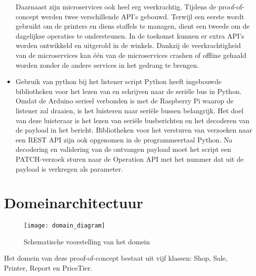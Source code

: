 \begin{itemize}
    Daarnaast zijn microservices ook heel erg veerkrachtig.
    Tijdens de proof-of-concept werden twee verschillende API's gebouwd. Terwijl een eerste wordt gebruikt om de printers en diens staffels te managen, dient een tweede om de dagelijkse operaties te ondersteunen. In de toekomst kunnen er extra API's worden ontwikkeld en uitgerold in de winkels. Dankzij de veerkrachtigheid van de microservices kan één van de microservices crashen of offline gehaald worden zonder de andere services in het gedrang te brengen.
    
    \item Gebruik van python bij het listener script
    Python heeft ingebouwde bibliotheken voor het lezen van en schrijven naar de seriële bus in Python. Omdat de Arduino serieel verbonden is met de Raspberry Pi waarop de listener zal draaien, is het luisteren naar seriële bussen belangrijk. Het doel van deze luisteraar is het lezen van seriële busberichten en het decoderen van de payload in het bericht.
    Bibliotheken voor het versturen van verzoeken naar een REST API zijn ook opgenomen in de programmeertaal Python. Na decodering en validering van de ontvangen payload moet het script een PATCH-verzoek sturen naar de Operation API met het nummer dat uit de payload is verkregen als parameter.
\end{itemize}

\section{Domeinarchitectuur}
\begin{figure}[H]
    \texttt{[image: domain\_diagram]}
    \centering
    \caption{Schematische voorstelling van het domein}
    \label{fig:domainArchitecture}
\end{figure}

Het domein van deze proof-of-concept bestaat uit vijf klassen: Shop, Sale, Printer, Report en PriceTier.

